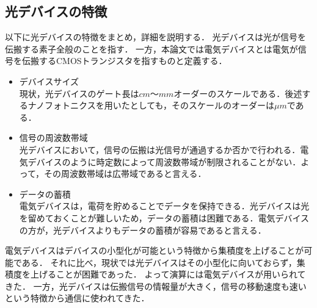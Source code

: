 \subsection{光デバイスの特徴}
以下に光デバイスの特徴をまとめ，詳細を説明する．
光デバイスは光が信号を伝搬する素子全般のことを指す．
一方，本論文では電気デバイスとは電気が信号を伝搬するCMOSトランジスタを指すものと定義する．
\begin{itemize}
\item デバイスサイズ\\
現状，光デバイスのゲート長は$cm$〜$mm$オーダーのスケールである．後述するナノフォトニクスを用いたとしても，そのスケールのオーダーは$\mu m$である．
\item 信号の周波数帯域\\
光デバイスにおいて，信号の伝搬は光信号が通過するか否かで行われる．電気デバイスのように時定数によって周波数帯域が制限されることがない．よって，その周波数帯域は広帯域であると言える．
\item データの蓄積\\
電気デバイスは，電荷を貯めることでデータを保持できる．光デバイスは光を留めておくことが難しいため，データの蓄積は困難である．電気デバイスの方が，光デバイスよりもデータの蓄積が容易であると言える．

\end{itemize}

電気デバイスはデバイスの小型化が可能という特徴から集積度を上げることが可能である．
それに比べ，現状では光デバイスはその小型化に向いておらず，集積度を上げることが困難であった．
よって演算には電気デバイスが用いられてきた．
一方，光デバイスは伝搬信号の情報量が大きく，信号の移動速度も速いという特徴から通信に使われてきた．

